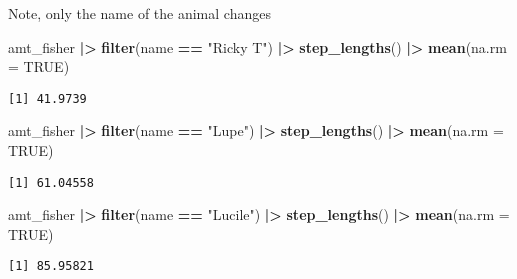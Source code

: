 \documentclass[ignorenonframetext,,t]{beamer}
\let\oldtextbf\textbf
\renewcommand{\textbf}[1]{\textcolor{spamwell}{\oldtextbf{#1}}}
\newenvironment{Shaded}{\begin{snugshade}}{\end{snugshade}}
\newcommand{\AttributeTok}[1]{\textcolor[rgb]{0.13,0.29,0.53}{#1}}
\newcommand{\ConstantTok}[1]{\textcolor[rgb]{0.56,0.35,0.01}{#1}}
\newcommand{\FunctionTok}[1]{\textcolor[rgb]{0.13,0.29,0.53}{\textbf{#1}}}
\newcommand{\NormalTok}[1]{#1}
\newcommand{\SpecialCharTok}[1]{\textcolor[rgb]{0.81,0.36,0.00}{\textbf{#1}}}
\newcommand{\StringTok}[1]{\textcolor[rgb]{0.31,0.60,0.02}{#1}}
\begin{document}
\begin{frame}[fragile]
Note, only the name of the animal changes

\begin{Shaded}
\begin{Highlighting}[]
\NormalTok{amt\_fisher }\SpecialCharTok{|\textgreater{}} \FunctionTok{filter}\NormalTok{(name }\SpecialCharTok{==} \StringTok{"Ricky T"}\NormalTok{) }\SpecialCharTok{|\textgreater{}} 
  \FunctionTok{step\_lengths}\NormalTok{() }\SpecialCharTok{|\textgreater{}} \FunctionTok{mean}\NormalTok{(}\AttributeTok{na.rm =} \ConstantTok{TRUE}\NormalTok{)}
\end{Highlighting}
\end{Shaded}

\begin{verbatim}
[1] 41.9739
\end{verbatim}

\begin{Shaded}
\begin{Highlighting}[]
\NormalTok{amt\_fisher }\SpecialCharTok{|\textgreater{}} \FunctionTok{filter}\NormalTok{(name }\SpecialCharTok{==} \StringTok{"Lupe"}\NormalTok{) }\SpecialCharTok{|\textgreater{}} 
  \FunctionTok{step\_lengths}\NormalTok{() }\SpecialCharTok{|\textgreater{}} \FunctionTok{mean}\NormalTok{(}\AttributeTok{na.rm =} \ConstantTok{TRUE}\NormalTok{)}
\end{Highlighting}
\end{Shaded}

\begin{verbatim}
[1] 61.04558
\end{verbatim}

\begin{Shaded}
\begin{Highlighting}[]
\NormalTok{amt\_fisher }\SpecialCharTok{|\textgreater{}} \FunctionTok{filter}\NormalTok{(name }\SpecialCharTok{==} \StringTok{"Lucile"}\NormalTok{) }\SpecialCharTok{|\textgreater{}} 
  \FunctionTok{step\_lengths}\NormalTok{() }\SpecialCharTok{|\textgreater{}} \FunctionTok{mean}\NormalTok{(}\AttributeTok{na.rm =} \ConstantTok{TRUE}\NormalTok{)}
\end{Highlighting}
\end{Shaded}

\begin{verbatim}
[1] 85.95821
\end{verbatim}
\end{frame}
\end{document}
